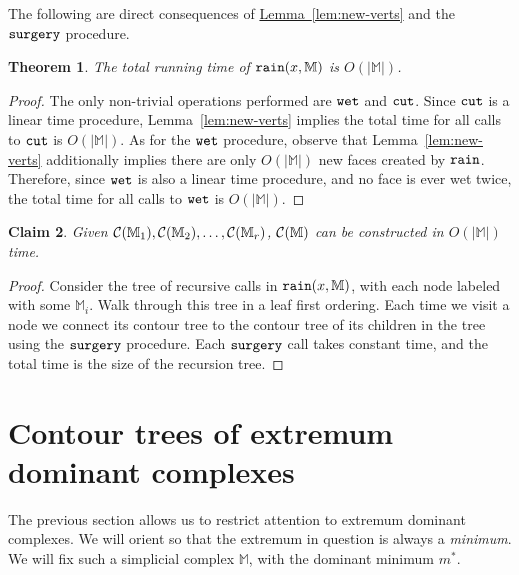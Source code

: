 \documentclass[11pt]{article}
\newtheorem{theorem}{Theorem}[section]
\newtheorem{claim}[theorem]{Claim}
\theoremstyle{definition}
\newcommand{\cC}{{\cal C}}
\newcommand{\MM}{\mathbb{M}}
\newcommand{\Lem}[1]{\hyperref[lem:#1]{Lemma~\ref*{lem:#1}}} %
\newcommand{\cut}{{\tt cut}}
\newcommand{\rain}{{\tt rain}}
\newcommand{\reeb}{\cC}
\newcommand{\surgery}{{\tt surgery}}
\newcommand{\wet}{{\tt wet}}
\begin{document}
The following are direct consequences of \Lem{new-verts} and the $\surgery$ procedure.

\begin{theorem} \label{thm:rain-time} The total running time of $\rain(x,\MM)$ is $O(|\MM|)$.
\end{theorem}
\begin{proof} The only non-trivial operations performed are $\wet$ and $\cut$.  
Since $\cut$ is a linear time procedure, Lemma~\ref{lem:new-verts} implies the total time for all calls to $\cut$ is $O(|\MM|)$.  
As for the $\wet$ procedure, observe that Lemma~\ref{lem:new-verts} additionally implies there are only $O(|\MM|)$ new faces created by $\rain$.
Therefore, since $\wet$ is also a linear time procedure, and no face is ever wet twice, the total time for all calls to $\wet$ is $O(|\MM|)$.
\end{proof}


\begin{claim} \label{clm:rain-reeb} Given $\reeb(\MM_1), \reeb(\MM_2), \ldots, \reeb(\MM_r)$, 
$\reeb(\MM)$ can be constructed in $O(|\MM|)$ time.
\end{claim}
\begin{proof} Consider the tree of recursive calls in $\rain(x,\MM)$, with each node
labeled with some $\MM_i$.
Walk through this tree in a leaf first ordering.  Each time we visit a node we connect its contour tree to the 
contour tree of its children in the tree using the $\surgery$ procedure. 
Each $\surgery$ call takes constant time, and the total time is the size of the recursion tree.
\end{proof}

\section{Contour trees of extremum dominant complexes} \label{sec:extreme}

The previous section allows us to restrict attention to extremum dominant complexes.
We will orient so that the extremum in question is always a \emph{minimum}.
We will fix such a simplicial complex $\MM$, with the dominant minimum $m^*$. 
\end{document}

